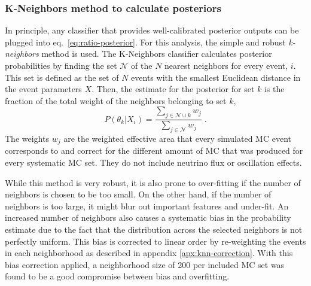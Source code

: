 \subsubsection{K-Neighbors method to calculate posteriors}
In principle, any classifier that provides well-calibrated posterior outputs can be plugged into eq.~\ref{eq:ratio-posterior}. For this analysis, the simple and robust \emph{k-neighbors} method is used.
The K-Neighbors classifier calculates posterior probabilities by finding the set $\mathcal{N}$ of the $N$ nearest neighbors for every event, $i$. This set is defined as the set of $N$ events with the smallest Euclidean distance in the event parameters $X$.  Then, the estimate for the posterior for set $k$ is the fraction of the total weight of the neighbors belonging to set $k$,
\begin{equation}
    P(\theta_k|X_i) = \frac{\sum_{j\in{\mathcal{N}\cup k}} w_j }{\sum_{j\in{\mathcal{N}}} w_j}\;. \label{eq:posterior-knn}
\end{equation}
The weights $w_j$ are the weighted effective area that every simulated MC event corresponds to and correct for the different amount of MC that was produced for every systematic MC set. They do not include neutrino flux or oscillation effects.

While this method is very robust, it is also prone to over-fitting if the number of neighbors is chosen to be too small. On the other hand, if the number of neighbors is too large, it might blur out important features and under-fit. An increased number of neighbors also causes a systematic bias in the probability estimate due to the fact that the distribution across the selected neighbors is not perfectly uniform. This bias is corrected to linear order by re-weighting the events in each neighborhood as described in appendix \ref{apx:knn-correction}. With this bias correction applied, a neighborhood size of 200 per included MC set was found to be a good compromise between bias and overfitting.

